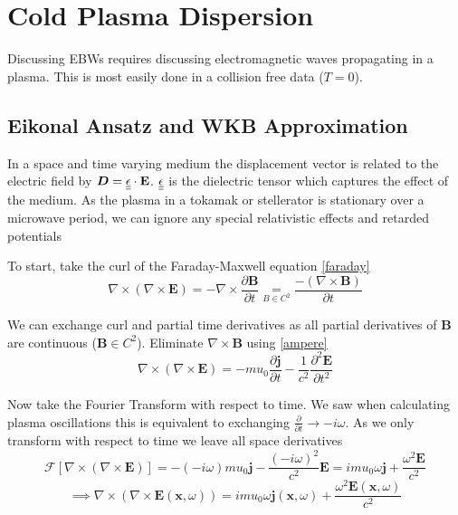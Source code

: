 \section{Cold Plasma Dispersion}
Discussing EBWs requires discussing electromagnetic waves propagating in a plasma. This is most easily done in a collision free data ($T=0$).
\subsection{Eikonal Ansatz and WKB Approximation}
In a space and time varying medium the displacement vector is related to the electric field by $\bm{D} = \underline{\underline{\epsilon}} \cdot \bf{E}$. $\underline{\underline{\epsilon}}$ is the dielectric tensor which captures the effect of the medium. As the plasma in a tokamak or stellerator is stationary over a microwave period, we can ignore any special relativistic effects and retarded potentials

To start, take the curl of the Faraday-Maxwell equation \eqref{faraday}
\begin{equation}
	\nabla \times \left( \nabla \times \bm{E} \right) = -\nabla \times \frac{\partial \bm{B}}{\partial t} \underset{B \in C^2}{=} \frac{- \left( \nabla \times \bm{B} \right)}{\partial t}
\end{equation}

We can exchange curl and partial time derivatives as all partial derivatives of $\bm{B}$ are continuous ($\bm{B} \in C^2$). Eliminate $\nabla \times \bm{B}$ using \eqref{ampere}
\begin{equation}
	\nabla \times \left( \nabla \times \bm{E} \right) = - mu_0 \frac{\partial \bm{j}}{\partial t} - \frac{1}{c^2} \frac{\partial^2 \bm{E}}{\partial t^2}
\end{equation}

Now take the Fourier Transform with respect to time. We saw when calculating plasma oscillations this is equivalent to exchanging $\frac{\partial}{\partial t} \rightarrow-i \omega$. As we only transform with respect to time we leave all space derivatives
\begin{equation*}
	\mathcal{F}\left[ \nabla \times \left( \nabla \times \bm{E} \right) \right] = - \left(-i \omega\right) mu_0 \bm{j} - \frac{\left(-i \omega\right)^2}{c^2} \bm{E} = i mu_0 \omega \bm{j} + \frac{\omega^2 \bm{E}}{c^2}
\end{equation*}
\begin{equation} \label{cold_plasma_wave_equation}
	\implies \nabla \times \left( \nabla \times \bm{E}\left( \bm{x}, \omega \right) \right) = i mu_0 \omega \bm{j} \left( \bm{x}, \omega \right) + \frac{\omega^2 \bm{E} \left( \bm{x}, \omega \right)}{c^2}
\end{equation}

